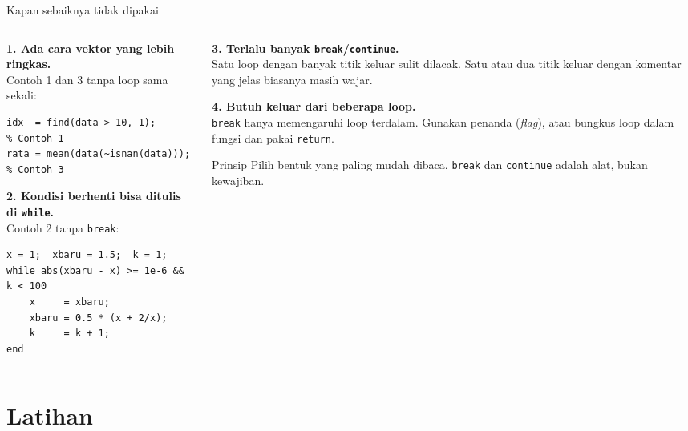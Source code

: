 \documentclass[aspectratio=169,10pt]{beamer}
\newcommand{\codesize}{\footnotesize}
\newcommand{\kode}[1]{\texttt{#1}}
\begin{document}
\begin{frame}[fragile]{Kapan sebaiknya \alert{tidak} dipakai}
  \renewcommand{\codesize}{\scriptsize}
  \begin{columns}[T]
    \begin{column}{0.48\textwidth}
      \textbf{1. Ada cara vektor yang lebih ringkas.}\\
      Contoh 1 dan 3 tanpa loop sama sekali:
\begin{lstlisting}
idx  = find(data > 10, 1);       % Contoh 1
rata = mean(data(~isnan(data))); % Contoh 3
\end{lstlisting}
      \vspace{6pt}
      \textbf{2. Kondisi berhenti bisa ditulis di \kode{while}.}\\
      Contoh 2 tanpa \kode{break}:
\begin{lstlisting}
x = 1;  xbaru = 1.5;  k = 1;
while abs(xbaru - x) >= 1e-6 && k < 100
    x     = xbaru;
    xbaru = 0.5 * (x + 2/x);
    k     = k + 1;
end
\end{lstlisting}
    \end{column}
    \begin{column}{0.48\textwidth}
      \textbf{3. Terlalu banyak \kode{break}/\kode{continue}.}\\
      \small Satu loop dengan banyak titik keluar sulit dilacak. Satu atau dua titik keluar dengan
      komentar yang jelas biasanya masih wajar.
      \vspace{8pt}

      \textbf{4. Butuh keluar dari beberapa loop.}\\
      \small \kode{break} hanya memengaruhi loop terdalam. Gunakan penanda (\textit{flag}), atau
      bungkus loop dalam fungsi dan pakai \kode{return}.
      \vspace{8pt}

      \begin{exampleblock}{Prinsip}
        Pilih bentuk yang paling mudah \alert{dibaca}. \kode{break} dan \kode{continue} adalah alat,
        bukan kewajiban.
      \end{exampleblock}
    \end{column}
  \end{columns}
\end{frame}

\section{Latihan}
\end{document}
